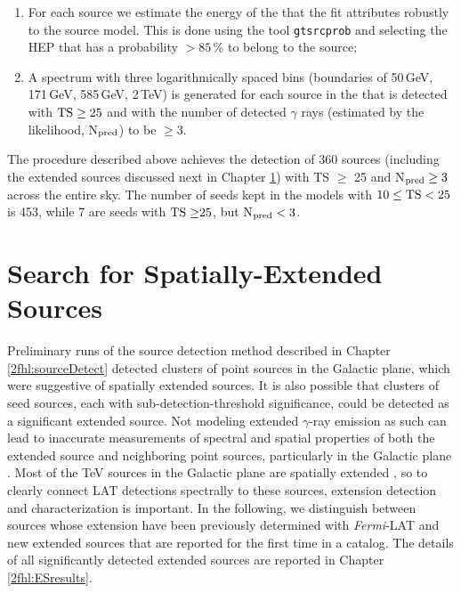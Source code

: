\begin{enumerate}
    \item For each source we estimate the energy of the \hep{}
    that the fit attributes robustly  to the source model. This is done using the tool {\tt gtsrcprob} and selecting the HEP that has a probability $>85$\,\% to belong to the source;
    
    \item A  spectrum with three logarithmically spaced bins (boundaries of 50\,GeV, 171\,GeV, 585\,GeV, 2\,TeV) is generated for each source in the \roi{} that is detected with ${\rm TS}\geq 25$ and with the number of detected $\gamma$ rays (estimated by the likelihood, N$_{\rm pred}$) to be $\geq$3.
    
    
\end{enumerate}

The procedure described above achieves the detection of 360 sources (including
the extended sources discussed next in Chapter \ref{2fhl:extended}) 
with TS $\geq$ 25 and N$_{\rm pred}\geq3$ across the entire sky.
The number of seeds kept in the \roi{} models
with $10\leq{\rm TS}<25$ is 453, while 7 are seeds with ${\rm TS\geq}25$, but N$_{\rm pred}<3$.

%
%
\section{Search for Spatially-Extended Sources}
\label{2fhl:extended}


Preliminary runs of the source detection method described in Chapter \ref{2fhl:sourceDetect} detected clusters of point sources in the Galactic plane, which were suggestive of spatially extended sources. It is also possible that clusters of seed sources, each with sub-detection-threshold significance, could be detected as a significant extended source. 
Not modeling extended $\gamma$-ray emission as such can lead to inaccurate measurements of spectral and spatial properties of both the extended source and neighboring point sources, particularly in the Galactic plane \citep{Lande12}. Most of the TeV sources in the Galactic plane are spatially
extended  \citep{carrigan2013, ong2013}, 
so to clearly connect LAT detections spectrally to these sources, extension detection and characterization is important.
In the following, we distinguish between sources whose extension
have been previously determined with {\it Fermi}-LAT and
new extended sources that are reported for the first time
in a \lat{} catalog. The details of all significantly
detected extended sources are reported  in Chapter \ref{2fhl:ESresults}. 

